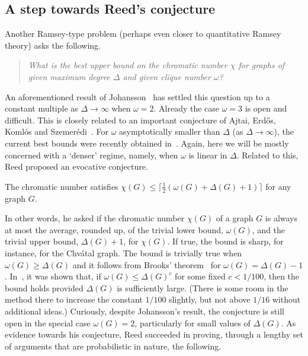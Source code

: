 \subsection{A step towards Reed's conjecture}\label{sub:Reed}

Another Ramsey-type problem (perhaps even closer to quantitative Ramsey theory) asks the following.
\begin{quote}\em
What is the best upper bound on the chromatic number $\chi$ for graphs of given maximum  degree $\Delta$ and given clique number $\omega$?
\end{quote}

\noindent
An aforementioned result of Johansson~\cite{Joh96} has settled this question up to a constant multiple as $\Delta\to\infty$ when $\omega=2$. Already the case $\omega=3$ is open and difficult. This is closely related to an important conjecture of Ajtai, Erd\H{o}s, Koml\'os and Szemer\'edi~\cite{AEKS81}. For $\omega$ asymptotically smaller than $\Delta$ (as $\Delta\to\infty$), the current best bounds were recently obtained in~\cite{DKPS20+}. Again, here we will be mostly concerned with a `denser' regime, namely, when $\omega$ is linear in $\Delta$. Related to this, Reed proposed an evocative conjecture.

\begin{conj}\label{conj:Ree98}
The chromatic number satisfies $\chi(G) \le \lceil \frac12(\omega(G)+\Delta(G)+1)\rceil$ for any graph $G$.
\end{conj}

\noindent
In other words, he asked if the chromatic number $\chi(G)$ of a graph $G$ is always at most the average, rounded up, of the trivial lower bound, $\omega(G)$, and the trivial upper bound, $\Delta(G)+1$, for $\chi(G)$.
If true, the bound is sharp, for instance, for the Chv\'atal graph. The bound is trivially true when $\omega(G)\ge\Delta(G)$ and it follows from Brooks' theorem~\cite{Bro41} for $\omega(G)=\Delta(G)-1$. 
In~\cite{DKPS20+}, it was shown that, if $\omega(G) \le \Delta(G)^c$ for some fixed $c<1/100$, then the bound holds provided $\Delta(G)$ is sufficiently large. (There is some room in the method there to increase the constant $1/100$ slightly, but not above $1/16$ without additional ideas.)
Curiously, despite Johansson's result, the conjecture is still open in the special case $\omega(G)=2$, particularly for small values of $\Delta(G)$.
As evidence towards his conjecture, Reed succeeded in proving, through a lengthy set of arguments that are probabilistic in nature, the following.

